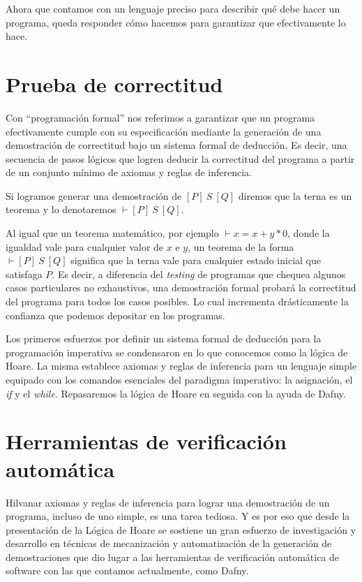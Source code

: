 \documentclass[12pt, a4paper, openany, fleqn]{book}
\newcommand{\hoare}[3]{\ensuremath{[#1]\ #2\ [#3]}}
\newcommand{\hoareTheoremBkp}[3]{\ensuremath{\vdash[#1]\ #2\ [#3]}}
\begin{document}
    Ahora que contamos con un lenguaje preciso para describir qué debe hacer un programa, queda responder cómo hacemos para garantizar que efectivamente lo hace.

    \section{Prueba de correctitud}
    Con ``programación formal'' nos referimos a garantizar que un programa efectivamente cumple con su especificación mediante la generación de una demostración de correctitud bajo un sistema formal de deducción. Es decir, una secuencia de pasos lógicos que logren deducir la correctitud del programa a partir de un conjunto mínimo de axiomas y reglas de inferencia.

    Si logramos generar una demostración de \hoare{P}{S}{Q} diremos que la terna es un teorema y lo denotaremos \hoareTheoremBkp{P}{S}{Q}.

    Al igual que un teorema matemático, por ejemplo $\vdash x = x + y * 0$, donde la igualdad vale para cualquier valor de $x$ e $y$, un teorema de la forma \hoareTheoremBkp{P}{S}{Q} significa que la terna vale para cualquier estado inicial que satisfaga $P$. Es decir, a diferencia del \textit{testing} de programas que chequea algunos casos particulares no exhaustivos, una demostración formal probará la correctitud del programa para todos los casos posibles. Lo cual incrementa drásticamente la confianza que podemos depositar en los programas.

    Los primeros esfuerzos por definir un sistema formal de deducción para la programación imperativa se condensaron en lo que conocemos como la lógica de Hoare.
    La misma establece axiomas y reglas de inferencia para un lenguaje simple equipado con los comandos esenciales del paradigma imperativo: la asignación, el \textit{if} y el \textit{while}. Repasaremos la lógica de Hoare en seguida con la ayuda de Dafny.

    \section{Herramientas de verificación automática}
    Hilvanar axiomas y reglas de inferencia para lograr una demostración de un programa, incluso de uno simple, es una tarea tediosa. Y es por eso que desde la presentación de la Lógica de Hoare se sostiene un gran esfuerzo de investigación y desarrollo en técnicas de mecanización y automatización de la generación de demostraciones que dio lugar a las herramientas de verificación automática de software con las que contamos actualmente, como Dafny.
\end{document}

